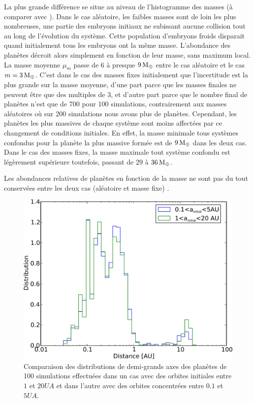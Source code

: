 La plus grande différence se situe au niveau de l'histogramme des masses  (à comparer avec
). Dans le cas aléatoire, les faibles masses sont de loin les plus nombreuses, une partie des embryons
initiaux ne subissant aucune collision tout au long de l'évolution du système. Cette population d'embryons froids disparait 
quand initialement tous les embryons ont la même masse. L'abondance des planètes décroit alors simplement en fonction de leur
masse, sans maximum local. La masse
moyenne $\mu_m$ passe de $6$ à presque $9\mathrm{\thinspace M_\oplus}$ entre le cas aléatoire et le cas $m=3\mathrm{\thinspace M_\oplus}$. C'est dans le cas des
masses fixes initialement que l'incertitude est la plus grande sur la masse moyenne, d'une part parce que les masses finales ne
peuvent être que des multiples de 3, et d'autre part parce que le nombre final de planètes n'est que de 700 pour 100
simulations,
contrairement aux masses aléatoires où sur 200 simulations nous avons plus de  planètes. Cependant, les planètes les plus
massives de chaque système sont moins affectées par ce changement de conditions initiales. En effet, la masse minimale tous
systèmes confondus pour la planète la plus massive formée est de $9\mathrm{\thinspace M_\oplus}$ dans les deux cas. Dans le cas des masses fixes, la
masse maximale tout 
système confondu est légèrement supérieure toutefois, passant de $29$ à $36\mathrm{\thinspace M_\oplus}$. 

Les abondances relatives de planètes en fonction de la masse ne sont pas du tout conservées entre les deux cas (aléatoire et masse fixe) .

\bigskip

\begin{figure}[htbp]
\centering
\includegraphics[width=0.65\linewidth]{figure/HSE/a_influence.pdf}
\caption[Influence des positions initiales sur les propriétés statistiques des systèmes formés.]{Comparaison des distributions
de demi-grands axes des planètes de 100 simulations effectuées dans un cas avec des orbites initiales entre $1$ et $20\unit{UA}$
et dans l'autre avec des orbites concentrées entre $0.1$ et $5\unit{UA}$.}\label{fig:HSE_a_influence}
\end{figure}

